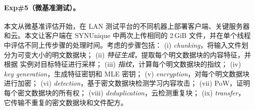 \paragraph*{Exp\#5（微基准测试）。}
本文从微基准评估开始，在 LAN 测试平台的不同机器上部署客户端、关键服务器和云。本文让客户端在 SYNUnique 中两次上传相同的 2\,GiB 文件，并在单个线程中评估不同上传步骤的处理时间。考虑的步骤包括： (i) {\em chunking}，将输入文件划分为可变大小的明文数据块； (ii) {\em 特征生成}，提取每个明文数据块的内容特征，并根据 \sysnameF 实例对目标特征进行采样； (iii) {\em 指纹}，计算每个明文数据块的指纹； (iv) {\em key generation}，生成特征密钥和 MLE 密钥； (v) {\em encryption}，对每个明文数据块进行加密； (vi) {\em detection}，基于密文数据块检测学习内容攻击； (vii) {PoW}，证明每个密文数据块的所有权； (viii) {\em deduplication}，云检测重复块； (ix) {\em transfer}，它传输不重复的密文数据块和文件配方。



